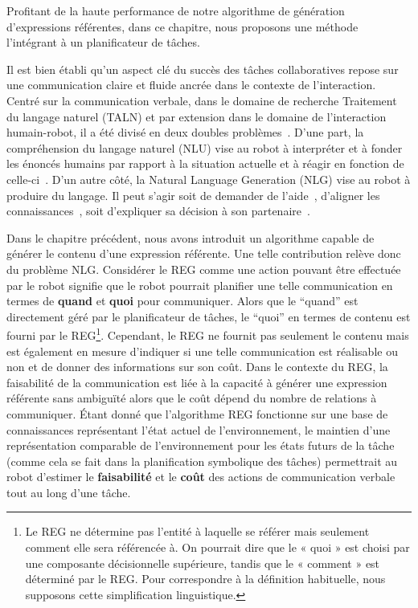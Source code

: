 Profitant de la haute performance de notre algorithme de génération d'expressions référentes, dans ce chapitre, nous proposons une méthode l'intégrant à un planificateur de tâches.

Il est bien établi qu'un aspect clé du succès des tâches collaboratives repose sur une communication claire et fluide ancrée dans le contexte de l'interaction. Centré sur la communication verbale, dans le domaine de recherche Traitement du langage naturel (TALN) et par extension dans le domaine de l'interaction humain-robot, il a été divisé en deux doubles problèmes~\cite{tellex_2020_robots}. D'une part, la compréhension du langage naturel (NLU) vise au robot à interpréter et à fonder les énoncés humains par rapport à la situation actuelle et à réagir en fonction de celle-ci~\cite{brawer_2018_situated}. D'un autre côté, la Natural Language Generation (NLG) vise au robot à produire du langage. Il peut s'agir soit de demander de l'aide~\cite{tellex_2014_asking}, d'aligner les connaissances~\cite{devin_2016_implemented}, soit d'expliquer sa décision à son partenaire~\cite{roncone_2017_transparent}.

Dans le chapitre précédent, nous avons introduit un algorithme capable de générer le contenu d'une expression référente. Une telle contribution relève donc du problème NLG. Considérer le REG comme une action pouvant être effectuée par le robot signifie que le robot pourrait planifier une telle communication en termes de \textbf{quand} et \textbf{quoi} pour communiquer. Alors que le ``quand'' est directement géré par le planificateur de tâches, le ``quoi'' en termes de contenu est fourni par le REG\footnote{Le REG ne détermine pas l'entité à laquelle se référer mais seulement comment elle sera référencée à. On pourrait dire que le « quoi » est choisi par une composante décisionnelle supérieure, tandis que le « comment » est déterminé par le REG. Pour correspondre à la définition habituelle, nous supposons cette simplification linguistique. }. Cependant, le REG ne fournit pas seulement le contenu mais est également en mesure d'indiquer si une telle communication est réalisable ou non et de donner des informations sur son coût. Dans le contexte du REG, la faisabilité de la communication est liée à la capacité à générer une expression référente sans ambiguïté alors que le coût dépend du nombre de relations à communiquer. Étant donné que l'algorithme REG fonctionne sur une base de connaissances représentant l'état actuel de l'environnement, le maintien d'une représentation comparable de l'environnement pour les états futurs de la tâche (comme cela se fait dans la planification symbolique des tâches) permettrait au robot d'estimer le \textbf {faisabilité} et le \textbf{coût} des actions de communication verbale tout au long d'une tâche.

